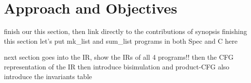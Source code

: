 \section{Approach and Objectives}

finish our this section, then link directly to the contributions of synopsis finishing this section
let's put mk_list and sum_list programs in both Spec and C here 

next section goes into the IR, show the IRs of all 4 programs!!
then the CFG representation of the IR
then introduce bisimulation and product-CFG
also introduce the invariants table


% 


